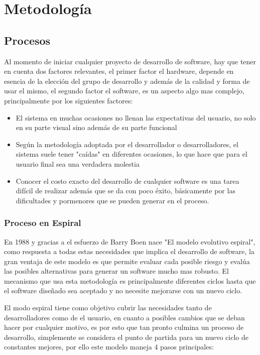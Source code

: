 \chapter{Metodología}
\section{Procesos}
Al momento de iniciar cualquier proyecto de desarrollo de software, hay que tener en cuenta dos factores relevantes, el primer factor el hardware, depende en esencia de la elección del grupo de desarrollo y además de la calidad y forma de usar el mismo, el segundo factor el software, es un aspecto algo mas complejo, principalmente por los siguientes factores:
\begin{itemize}
\item El sistema en muchas ocasiones no llenan las expectativas del usuario, no solo en su parte visual sino además de su parte funcional
\item Según la metodología adoptada por el desarrollador o desarrolladores, el sistema suele tener "caídas" en diferentes ocasiones, lo que hace que para el usuario final sea una verdadera molestia
\item Conocer el costo exacto del desarrollo de cualquier software es una tarea difícil de realizar además que se da con poco éxito, básicamente por las dificultades y pormenores que se pueden generar en el proceso.

\end{itemize}
\subsection{Proceso en Espiral}
En 1988 y gracias a el esfuerzo de Barry Boen nace "El modelo evolutivo espiral", como respuesta a todas estas necesidades que implica el desarrollo de software, la gran ventaja de este modelo es que permite evaluar cada posible riesgo y evalúa las posibles alternativas para generar un software mucho mas robusto. El mecanismo que usa esta metodología es principalmente diferentes ciclos hasta que el software diseñado sea aceptado y no necesite mejorarse con un nuevo ciclo.

El modo espiral tiene como objetivo cubrir las necesidades tanto de desarrolladores como de el usuario, en cuanto a posibles cambios que se deban hacer por cualquier motivo, es por esto que tan pronto culmina un proceso de desarrollo, simplemente se considera el punto de partida para un nuevo ciclo de constantes mejores, por ello este modelo maneja 4 pasos principales:

